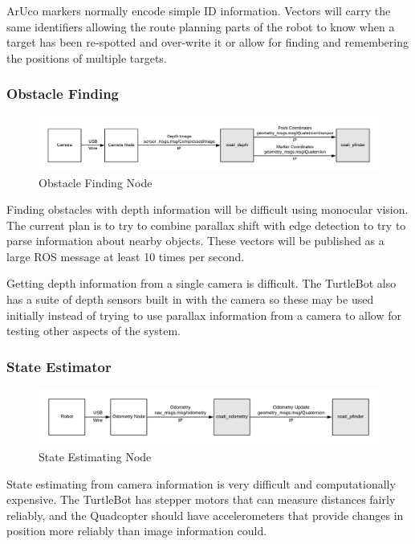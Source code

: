 \documentclass{article}
\begin{document}
	ArUco markers normally encode simple ID information. Vectors will carry the same identifiers allowing the route planning parts of the robot to know when a target has been re-spotted and over-write it or allow for finding and remembering the positions of multiple targets. 
	
	\subsubsection{Obstacle Finding}
	
	\begin{figure}[H]
		\centering
		\includegraphics[width=0.9\linewidth]{DepthDiagram.png}
		\caption{Obstacle Finding Node}
		\label{fig:obstacle}
	\end{figure}

	Finding obstacles with depth information will be difficult using monocular vision. The current plan is to try to combine parallax shift with edge detection to try to parse information about nearby objects. These vectors will be published as a large ROS message at least 10 times per second. 
	
	Getting depth information from a single camera is difficult. The TurtleBot also has a suite of depth sensors built in with the camera so these may be used initially instead of trying to use parallax information from a camera to allow for testing other aspects of the system.
	
	\subsubsection{State Estimator}
	
	\begin{figure}[H]
		\centering
		\includegraphics[width=0.9\linewidth]{OdometryDigram.png}
		\caption{State Estimating Node}
		\label{fig:state}
	\end{figure}

	State estimating from camera information is very difficult and computationally expensive. The TurtleBot has stepper motors that can measure distances fairly reliably, and the Quadcopter should have accelerometers that provide changes in position more reliably than image information could. 
	
\end{document}

